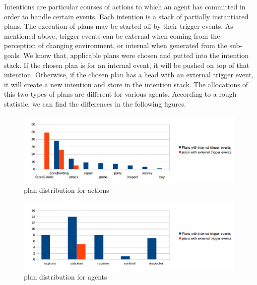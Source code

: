 \documentclass{llncs}
\begin{document}
Intentions are particular courses of actions to which an agent has committed in order to handle certain events. Each intention is a stack of partially instantiated plans\cite{rafael_Javabased_2007}. The execution of plans may be started off by their trigger events. As mentioned above, trigger events can be external when coming from the perception of changing environment, or internal when generated from the sub-goals. We know that, applicable plans were chosen and putted into the intention stack. If the chosen plan is for an internal event, it will be pushed on top of that intention. Otherwise, if the chosen plan has a head with an external trigger event, it will create a new intention and store in the intention stack. The allocations of this two types of plans are different for various agents. According to a rough statistic, we can find the differences in the following figures.
\begin{figure}
\centering
\begin{minipage}[!htbp]{\linewidth}
\includegraphics[width=5.0in]{images/BDI_plan_distribution_action}
\caption{plan distribution for actions}
\label{fig:plan_allocation}
\end{minipage}
\end{figure}
\begin{figure}
\centering
\begin{minipage}[!htbp]{\linewidth}
\includegraphics[width=5.0in]{images/BDI_plan_distribution_role}
\caption{plan distribution for agents}
\label{fig:baselinex}
\end{minipage}
\end{figure}
 
\end{document}
